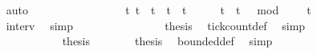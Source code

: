 \begin{isabellebody}
\ \ \ \ \ \ \ \ \ \ \ \ \ \ \ \ \isamarkupfalse%
\ auto\ \isanewline
\ \ \ \ \ \ \ \ \ \ \ \ \ \ \isamarkupfalse%
\ {\isacartoucheopen}{\isacharbraceleft}t{\isachardot}\ t\ {\isasymle}\ t\ {\isasymand}\ t\ {\isacharless}\ t\ {\isacharplus}\ {}\ {\isasymand}\ {}\ {\isasymle}\ t\ {\isasymand}\ {\isacharparenleft}t\ {\isacharminus}\ {}{\isacharparenright}\ mod\ {}\ {\isacharequal}\ {}{\isacharbraceright}\ {\isacharequal}\ {\isacharbraceleft}t\isanewline
\ \ \ \ \ \ \ \ \ \ \ \ \ \ \ \ \isamarkupfalse%
\ interv{\isacharunderscore}{}\ \isamarkupfalse%
\ simp\isanewline
\ \ \ \ \ \ \ \ \ \ \ \ \ \ \isamarkupfalse%
\ {\isacharquery}thesis\ \isamarkupfalse%
\ tick{\isacharunderscore}count{\isacharunderscore}def\ \isamarkupfalse%
\ simp\isanewline
\ \ \ \ \ \ \ \ \ \ \isamarkupfalse%
\isanewline
\ \ \ \ \ \ \isamarkupfalse%
\isanewline
\ \ \ \ \isacommand{{\isacharbraceright}}\isamarkupfalse%
\isanewline
\ \ \ \ \isamarkupfalse%
\ {\isacharquery}thesis\ \isacommand{{\isachardot}{\isachardot}}\isamarkupfalse%
\isanewline
\ \ \isamarkupfalse%
\isanewline
\ \ \isamarkupfalse%
\ {\isacharquery}thesis\ \isamarkupfalse%
\ bounded{\isacharunderscore}def\ \isamarkupfalse%
\ simp\isanewline
{}\isamarkupfalse%
%
\endisatagproof
{\isafoldproof}%
%
\isadelimproof
\isanewline
%
\endisadelimproof
%
\isadelimtheory
\isanewline
%
\endisadelimtheory
%
\isatagtheory
{}\isamarkupfalse%
%
\endisatagtheory
{\isafoldtheory}%
%
\isadelimtheory
%
\endisadelimtheory
%
\end{isabellebody}%
\endinput
